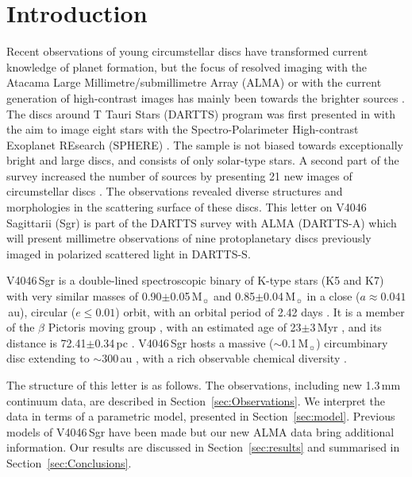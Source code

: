 \documentclass[letters,usenatbib,times]{mnras}
\begin{document}
\section{Introduction} \label{sec:Introduction}

Recent observations of young circumstellar discs have transformed current knowledge of planet formation, but the focus of resolved imaging with the Atacama Large Millimetre/submillimetre Array (ALMA) or with 
the current generation of high-contrast images 
has mainly been towards the brighter sources \citep{Andrews2020arXiv200105007A}. The discs around T Tauri Stars (DARTTS) program was first presented in \citet{Avenhaus_2018} with the aim to image eight stars with the Spectro-Polarimeter High-contrast Exoplanet REsearch (SPHERE) \citep{2019A&A...631A.155B}. The sample is not biased towards exceptionally bright and large discs, and consists of only solar-type stars. A second part of the survey increased the number of sources by presenting 21 new images of circumstellar discs \citep{Garufi2020}. The observations revealed diverse structures and morphologies in the scattering surface of these discs. This letter on V4046 Sagittarii (Sgr) is part of the DARTTS survey with ALMA (DARTTS-A) which will present millimetre observations of nine protoplanetary discs previously imaged in polarized scattered light in DARTTS-S. 

V4046\,Sgr is a double-lined spectroscopic binary of K-type stars (K5 and K7) with very similar masses of 0.90$\pm$0.05\,M$_{\sun}$ and 0.85$\pm$0.04\,M$_{\sun}$ \citep{Rosenfeld_2012} in a close ($a \approx 0.041$\,au), circular ($e\leq0.01$) orbit, with an orbital period of 2.42 days \citep{refId0}. It is a member of the $\beta$ Pictoris moving group \citep{Zuckerman_2004}, with an estimated age of 23$\pm$3\,Myr \citep{Mamajek_2014}, and its distance is 72.41$\pm$0.34\,pc \citep{Gaia}. V4046\,Sgr hosts a massive ($\sim$0.1\,M$_{\sun}$) circumbinary disc extending to $\sim$300\,au \citep{Rosenfeld_2013, Rodriguez_2010}, with a rich observable chemical diversity \citep{Kastner_2018}. 

The structure of this letter is as follows. The observations, including new 1.3\,mm continuum data, are described in Section~\ref{sec:Observations}. We interpret the data in terms of a parametric model, presented in Section~\ref{sec:model}. Previous models of V4046\,Sgr have been made \citep{Ru_z_Rodr_guez_2019, Rosenfeld_2013, 2019ApJ...882..160Q} but our new ALMA data bring additional information. Our results are discussed in Section~\ref{sec:results} and summarised in Section~\ref{sec:Conclusions}.
\end{document}
